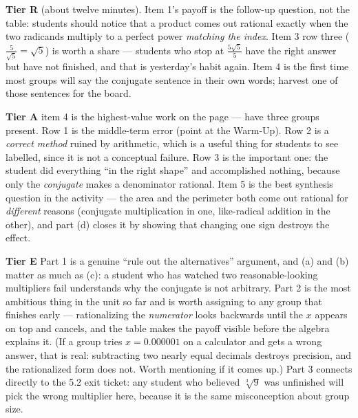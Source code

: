 \documentclass[10pt]{article}
\begin{document}
\begin{teachernote}
\textbf{Tier R} (about twelve minutes). Item 1's payoff is the follow-up question, not the table:
students should notice that a product comes out rational exactly when the two radicands multiply to
a perfect power \emph{matching the index}. Item 3 row three ($\frac{5}{\sqrt5}=\sqrt5$) is worth a
share --- students who stop at $\frac{5\sqrt5}{5}$ have the right answer but have not finished, and
that is yesterday's habit again. Item 4 is the first time most groups will say the conjugate
sentence in their own words; harvest one of those sentences for the board.

\textbf{Tier A} item 4 is the highest-value work on the page --- have three groups present. Row 1 is
the middle-term error (point at the Warm-Up). Row 2 is a \emph{correct method} ruined by
arithmetic, which is a useful thing for students to see labelled, since it is not a conceptual
failure. Row 3 is the important one: the student did everything ``in the right shape'' and
accomplished nothing, because only the \emph{conjugate} makes a denominator rational. Item 5 is the
best synthesis question in the activity --- the area and the perimeter both come out rational for
\emph{different} reasons (conjugate multiplication in one, like-radical addition in the other), and
part (d) closes it by showing that changing one sign destroys the effect.

\textbf{Tier E} Part 1 is a genuine ``rule out the alternatives'' argument, and (a) and (b) matter
as much as (c): a student who has watched two reasonable-looking multipliers fail understands why
the conjugate is not arbitrary. Part 2 is the most ambitious thing in the unit so far and is worth
assigning to any group that finishes early --- rationalizing the \emph{numerator} looks backwards
until the $x$ appears on top and cancels, and the table makes the payoff visible before the algebra
explains it. (If a group tries $x=0.000001$ on a calculator and gets a wrong answer, that is real:
subtracting two nearly equal decimals destroys precision, and the rationalized form does not. Worth
mentioning if it comes up.) Part 3 connects directly to the 5.2 exit ticket: any student who
believed $\sqrt[3]{9}$ was unfinished will pick the wrong multiplier here, because it is the same
misconception about group size.
\end{teachernote}
\end{document}
